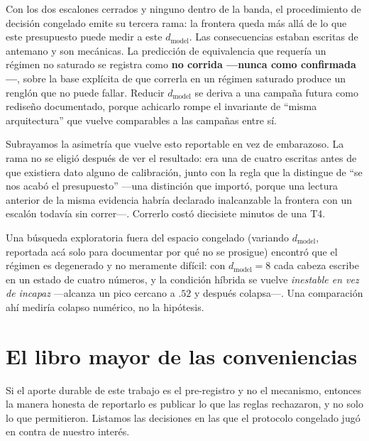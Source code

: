 \documentclass[jou,11pt,donotrepeattitle]{apa7}
\begin{document}
Con los dos escalones cerrados y ninguno dentro de la banda, el procedimiento de decisi\'on
congelado emite su tercera rama: la frontera queda m\'as all\'a de lo que este presupuesto puede
medir a este $d_{\text{model}}$. Las consecuencias estaban escritas de antemano y son
mec\'anicas. La predicci\'on de equivalencia que requer\'ia un r\'egimen no saturado se registra
como \textbf{no corrida ---nunca como confirmada---}, sobre la base expl\'icita de que correrla
en un r\'egimen saturado produce un rengl\'on que no puede fallar. Reducir $d_{\text{model}}$ se
deriva a una campa\~na futura como redise\~no documentado, porque achicarlo rompe el invariante
de \enquote{misma arquitectura} que vuelve comparables a las campa\~nas entre s\'i.

Subrayamos la asimetr\'ia que vuelve esto reportable en vez de embarazoso. La rama no se eligi\'o
despu\'es de ver el resultado: era una de cuatro escritas antes de que existiera dato alguno de
calibraci\'on, junto con la regla que la distingue de \enquote{se nos acab\'o el presupuesto}
---una distinci\'on que import\'o, porque una lectura anterior de la misma evidencia habr\'ia
declarado inalcanzable la frontera con un escal\'on todav\'ia sin correr---. Correrlo cost\'o
diecisiete minutos de una T4.

Una b\'usqueda exploratoria fuera del espacio congelado (variando $d_{\text{model}}$, reportada
ac\'a solo para documentar por qu\'e no se prosigue) encontr\'o que el r\'egimen es degenerado y
no meramente dif\'icil: con $d_{\text{model}}=8$ cada cabeza escribe en un estado de cuatro
n\'umeros, y la condici\'on h\'ibrida se vuelve \emph{inestable en vez de incapaz} ---alcanza un
pico cercano a $.52$ y despu\'es colapsa---. Una comparaci\'on ah\'i medir\'ia colapso
num\'erico, no la hip\'otesis.

\section{El libro mayor de las conveniencias}

Si el aporte durable de este trabajo es el pre-registro y no el mecanismo, entonces la manera
honesta de reportarlo es publicar lo que las reglas rechazaron, y no solo lo que permitieron.
Listamos las decisiones en las que el protocolo congelado jug\'o en contra de nuestro inter\'es.
\end{document}
